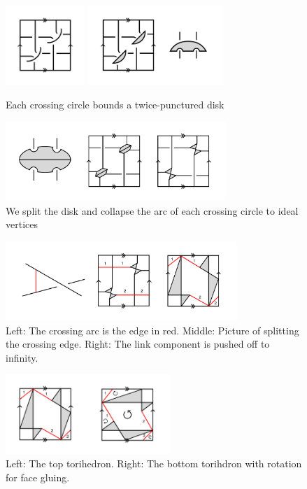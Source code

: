 \documentclass[11pt]{amsart}
\theoremstyle{plain}
\theoremstyle{definition}
\begin{document}
\begin{figure}[h] 
\centering
\includegraphics[height=3cm]{fig-3.png}
\includegraphics[height=3cm]{fig-4.png}
	\caption{Each crossing circle bounds a twice-punctured disk}
	\label{fig:step_one}
\end{figure}
 
\begin{figure}[h] 
\centering 
\includegraphics[height=3cm]{fig-5.png} 
	\caption{We split the disk and collapse the arc of each
 crossing circle to ideal vertices}
	\label{fig:step_two}
\end{figure}


\begin{figure}[h] 
\centering 
\includegraphics[height=3cm]{fig-6.png} 
\caption{Left: The crossing arc is the edge in red.
Middle: Picture of splitting the crossing edge. Right: The link component is
pushed off to infinity.}
	\label{fig:step_three}
\end{figure}

\begin{figure}[h] 
\centering 
\includegraphics[height=3cm]{top-bottom.png} 
	\caption{Left: The top torihedron. Right: The bottom torihdron with rotation for face gluing.} 
\label{fig:top-bottom}
\end{figure}
\end{document}

